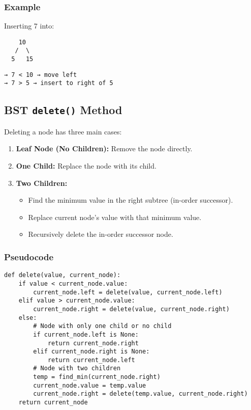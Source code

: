 \subsubsection*{Example}
Inserting 7 into:
\begin{verbatim}
    10
   /  \
  5   15
\end{verbatim}
\begin{verbatim}
→ 7 < 10 → move left
→ 7 > 5 → insert to right of 5
\end{verbatim}

\subsection{BST \texttt{delete()} Method}

Deleting a node has three main cases:

\begin{enumerate}
    \item \textbf{Leaf Node (No Children):} Remove the node directly.
    \item \textbf{One Child:} Replace the node with its child.
    \item \textbf{Two Children:}
    \begin{itemize}
        \item Find the minimum value in the right subtree (in-order successor).
        \item Replace current node’s value with that minimum value.
        \item Recursively delete the in-order successor node.
    \end{itemize}
\end{enumerate}

\subsubsection*{Pseudocode}
\begin{verbatim}
def delete(value, current_node):
    if value < current_node.value:
        current_node.left = delete(value, current_node.left)
    elif value > current_node.value:
        current_node.right = delete(value, current_node.right)
    else:
        # Node with only one child or no child
        if current_node.left is None:
            return current_node.right
        elif current_node.right is None:
            return current_node.left
        # Node with two children
        temp = find_min(current_node.right)
        current_node.value = temp.value
        current_node.right = delete(temp.value, current_node.right)
    return current_node
\end{verbatim}

